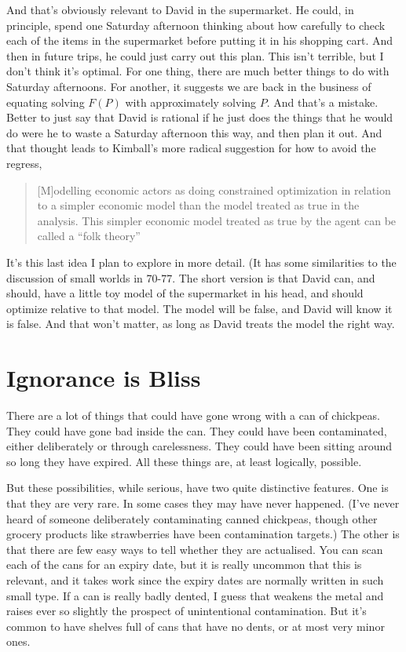 \documentclass[11pt,]{book}
\begin{document}
And that's obviously relevant to David in the supermarket. He could, in principle, spend one Saturday afternoon thinking about how carefully to check each of the items in the supermarket before putting it in his shopping cart. And then in future trips, he could just carry out this plan. This isn't terrible, but I don't think it's optimal. For one thing, there are much better things to do with Saturday afternoons. For another, it suggests we are back in the business of equating solving \(F(P)\) with approximately solving \(P\). And that's a mistake. Better to just say that David is rational if he just does the things that he would do were he to waste a Saturday afternoon this way, and then plan it out. And that thought leads to Kimball's more radical suggestion for how to avoid the regress,

\begin{quote}
{[}M{]}odelling economic actors as doing constrained optimization in relation to a simpler economic model than the model treated as true in the analysis. This simpler economic model treated as true by the agent can be called a ``folk theory'' \citep[ 175]{Kimball2015}
\end{quote}

It's this last idea I plan to explore in more detail. (It has some similarities to the discussion of small worlds in \citet{Joyce1999} 70-77. The short version is that David can, and should, have a little toy model of the supermarket in his head, and should optimize relative to that model. The model will be false, and David will know it is false. And that won't matter, as long as David treats the model the right way.

\hypertarget{ignorancebliss}{%
\section{Ignorance is Bliss}\label{ignorancebliss}}

There are a lot of things that could have gone wrong with a can of chickpeas. They could have gone bad inside the can. They could have been contaminated, either deliberately or through carelessness. They could have been sitting around so long they have expired. All these things are, at least logically, possible.

But these possibilities, while serious, have two quite distinctive features. One is that they are very rare. In some cases they may have never happened. (I've never heard of someone deliberately contaminating canned chickpeas, though other grocery products like strawberries have been contamination targets.) The other is that there are few easy ways to tell whether they are actualised. You can scan each of the cans for an expiry date, but it is really uncommon that this is relevant, and it takes work since the expiry dates are normally written in such small type. If a can is really badly dented, I guess that weakens the metal and raises ever so slightly the prospect of unintentional contamination. But it's common to have shelves full of cans that have no dents, or at most very minor ones.
\end{document}
